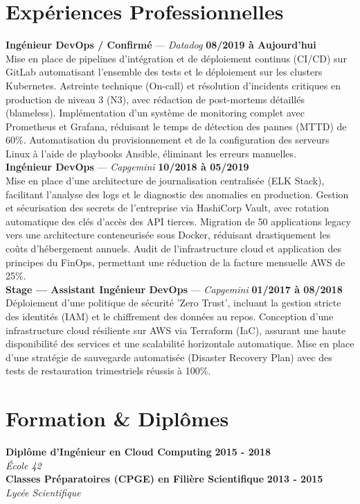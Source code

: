 \documentclass[11pt,a4paper]{article}
\begin{document}
\section*{Expériences Professionnelles}
\noindent \textbf{Ingénieur DevOps / Confirmé} --- \textit{Datadog} \hfill \textbf{08/2019 à Aujourd'hui} \\
Mise en place de pipelines d'intégration et de déploiement continus (CI/CD) sur GitLab automatisant l'ensemble des tests et le déploiement sur les clusters Kubernetes. Astreinte technique (On-call) et résolution d'incidents critiques en production de niveau 3 (N3), avec rédaction de post-mortems détaillés (blameless). Implémentation d'un système de monitoring complet avec Prometheus et Grafana, réduisant le temps de détection des pannes (MTTD) de 60\%. Automatisation du provisionnement et de la configuration des serveurs Linux à l'aide de playbooks Ansible, éliminant les erreurs manuelles. \\[0.3cm]
\noindent \textbf{Ingénieur DevOps} --- \textit{Capgemini} \hfill \textbf{10/2018 à 05/2019} \\
Mise en place d'une architecture de journalisation centralisée (ELK Stack), facilitant l'analyse des logs et le diagnostic des anomalies en production. Gestion et sécurisation des secrets de l'entreprise via HashiCorp Vault, avec rotation automatique des clés d'accès des API tierces. Migration de 50 applications legacy vers une architecture conteneurisée sous Docker, réduisant drastiquement les coûts d'hébergement annuels. Audit de l'infrastructure cloud et application des principes du FinOps, permettant une réduction de la facture mensuelle AWS de 25\%. \\[0.3cm]
\noindent \textbf{Stage — Assistant Ingénieur DevOps} --- \textit{Capgemini} \hfill \textbf{01/2017 à 08/2018} \\
Déploiement d'une politique de sécurité 'Zero Trust', incluant la gestion stricte des identités (IAM) et le chiffrement des données au repos. Conception d'une infrastructure cloud résiliente sur AWS via Terraform (IaC), assurant une haute disponibilité des services et une scalabilité horizontale automatique. Mise en place d'une stratégie de sauvegarde automatisée (Disaster Recovery Plan) avec des tests de restauration trimestriels réussis à 100\%. \\[0.3cm]


\vspace{0.3cm}

\section*{Formation \& Diplômes}
\noindent \textbf{Diplôme d'Ingénieur en Cloud Computing} \hfill \textbf{2015 - 2018} \\
\textit{École 42} \\[0.3cm]
\noindent \textbf{Classes Préparatoires (CPGE) en Filière Scientifique} \hfill \textbf{2013 - 2015} \\
\textit{Lycée Scientifique} \\[0.3cm]
\end{document}
